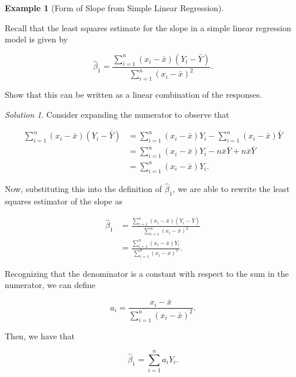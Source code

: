 \documentclass[
  letterpaper,
  DIV=11,
  numbers=noendperiod]{scrreprt}
\theoremstyle{definition}
\theoremstyle{definition}
\newtheorem{example}{Example}[chapter]
\theoremstyle{plain}
\theoremstyle{remark}
\newtheorem*{solution}{Solution}
\begin{document}
\begin{example}[Form of Slope from Simple Linear
Regression]\protect\hypertarget{exm-slope-linear-combination}{}\label{exm-slope-linear-combination}

Recall that the least squares estimate for the slope in a simple linear
regression model is given by

\[\widehat{\beta}_1 = \frac{\sum_{i=1}^{n} \left(x_i - \bar{x}\right)\left(Y_i - \bar{Y}\right)}{\sum_{i=1}^{n} \left(x_i - \bar{x}\right)^2}.\]

Show that this can be written as a linear combination of the responses.

\end{example}

\begin{solution}

Consider expanding the numerator to observe that

\[
\begin{aligned}
  \sum_{i=1}^{n} \left(x_i - \bar{x}\right) \left(Y_i - \bar{Y}\right)
    &= \sum_{i=1}^{n} \left(x_i - \bar{x}\right) Y_i - \sum_{i=1}^{n} \left(x_i - \bar{x}\right) \bar{Y} \\
    &= \sum_{i=1}^{n} \left(x_i - \bar{x}\right) Y_i - n\bar{x}\bar{Y} + n\bar{x}\bar{Y} \\
    &= \sum_{i=1}^{n} \left(x_i - \bar{x}\right) Y_i.
\end{aligned}
\]

Now, substituting this into the definition of \(\widehat{\beta}_1\), we
are able to rewrite the least squares estimator of the slope as

\[
\begin{aligned}
  \widehat{\beta}_1
    &= \frac{\sum_{i=1}^{n} \left(x_i - \bar{x}\right)\left(Y_i - \bar{Y}\right)}{\sum_{i=1}^{n} \left(x_i - \bar{x}\right)^2} \\
    &= \frac{\sum_{i=1}^{n} \left(x_i - \bar{x}\right) Y_i}{\sum_{i=1}^{n} \left(x_i - \bar{x}\right)^2}. 
\end{aligned}
\]

Recognizing that the denominator is a constant with respect to the sum
in the numerator, we can define

\[a_i = \frac{x_i - \bar{x}}{\sum_{i=1}^{n} \left(x_i - \bar{x}\right)^2}.\]

Then, we have that

\[\widehat{\beta}_1 = \sum_{i=1}^{n} a_i Y_i.\]

\end{solution}
\end{document}
